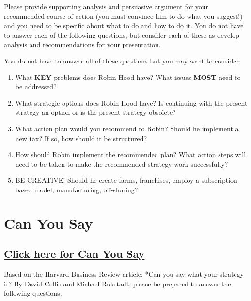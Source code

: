 \documentclass[
]{book}
\providecommand{\tightlist}{%
  \setlength{\itemsep}{0pt}\setlength{\parskip}{0pt}}
\begin{document}
Please provide supporting analysis and persuasive argument for your recommended course of action (you must convince him to do what you suggest!) and you need to be specific about what to do and how to do it. You do not have to answer each of the following questions, but consider each of these as develop analysis and recommendations for your presentation.

You do not have to answer all of these questions but you may want to consider:

\begin{enumerate}
\def\labelenumi{\arabic{enumi}.}
\tightlist
\item
  What \textbf{KEY} problems does Robin Hood have? What issues \textbf{MOST} need to be addressed?
\item
  What strategic options does Robin Hood have? Is continuing with the present strategy an option or is the present strategy obsolete?
\item
  What action plan would you recommend to Robin? Should he implement a new tax? If so, how should it be structured?
\item
  How should Robin implement the recommended plan? What action steps will need to be taken to make the recommended strategy work successfully?
\item
  BE CREATIVE! Should he create farms, franchises, employ a subscription-based model, manufacturing, off-shoring?
\end{enumerate}

\hypertarget{can-you-say}{%
\chapter{Can You Say}\label{can-you-say}}

\hypertarget{click-here-for-can-you-say}{%
\section{\texorpdfstring{\href{https://strategygurus.com/wp-content/uploads/2020/05/Can-you-say-what-your-strategy-is.pdf}{Click here for Can You Say}}{Click here for Can You Say}}\label{click-here-for-can-you-say}}

Based on the Harvard Business Review article: *Can you say what your strategy is? By David Collis and Michael Rukstadt, please be prepared to answer the following questions:
\end{document}
